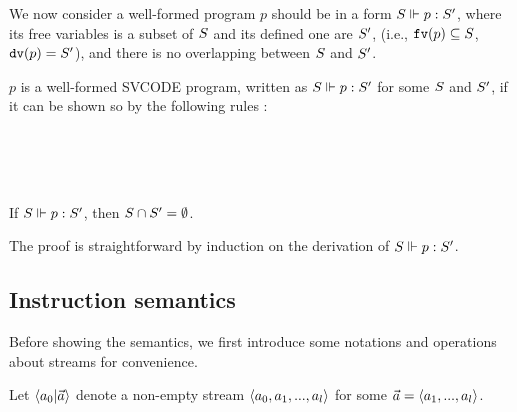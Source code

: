 We now consider a well-formed program $p$ should be in a form $\wf{p}{S}{S'}$, where its free variables is a subset of $\S$ and its defined one are $\S'$, (i.e., $\FV{p} \subseteq \S$, $\dv{p} = \S'$), and there is no overlapping between $\S$ and $\S'$.
\begin{defi}
	$p$ is a well-formed SVCODE program, written as $\wf{p}{S}{S'}$ for some $\S$ and $\S'$,  if it can be shown so by the following rules :
\end{defi}
	
    \\[3ex]
   	
   	\\[3ex]
   
   \\[3ex]

\begin{lem}
	If $\wf{p}{\S}{\S'}$, then  $\S \cap \S' = \emptyset $. 
\end{lem}

The proof is straightforward by induction on the derivation of $\wf{p}{S}{S'}$.



\subsection{Instruction semantics}

Before showing the semantics, we first introduce some notations and operations about streams for convenience.
\begin{nota}
	Let $\< a_0 | \a \'>$ denote a non-empty stream $\< a_0,a_1,...,a_l \'>$ for some $\a = \< a_1,...,a_l \'>$. 
\end{nota}


